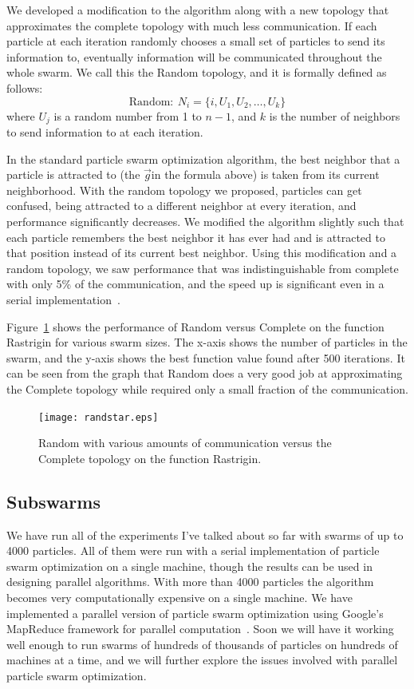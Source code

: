 \documentclass[onecolumn, 12pt]{article}
\providecommand{\gbest}{\ensuremath{\Vec{g}}}
\begin{document}
We developed a modification to the algorithm along with a new topology that
approximates the complete topology with much less communication.  If each
particle at each iteration randomly chooses a small set of particles to send
its information to, eventually information will be communicated throughout the
whole swarm.  We call this the Random topology, and it is formally defined as
follows:
\[\mathrm{Random:}\ N_i = \{i,U_1,U_2,\dots,U_k\}\]
where $U_j$ is a random number from 1 to $n-1$, and $k$ is the number of 
neighbors to send information to at each iteration.

In the standard particle swarm optimization algorithm, the best neighbor that a
particle is attracted to (the \gbest in the formula above) is taken from its
current neighborhood.  With the random topology we proposed, particles can get
confused, being attracted to a different neighbor at every iteration, and
performance significantly decreases.  We modified the algorithm slightly such
that each particle remembers the best neighbor it has ever had and is attracted
to that position instead of its current best neighbor.  Using this modification
and a random topology, we saw performance that was indistinguishable from
complete with only 5\% of the communication, and the speed up is significant
even in a serial implementation~\cite{mcnabb-cec09}.  

Figure~\ref{fig:rastrand} shows the performance of Random versus Complete on
the function Rastrigin for various swarm sizes.  The x-axis shows the number of
particles in the swarm, and the y-axis shows the best function value found
after 500 iterations.  It can be seen from the graph that Random does a very
good job at approximating the Complete topology while required only a small
fraction of the communication.

\begin{figure}
  \centering
  \texttt{[image: randstar.eps]}
  \caption{Random with various amounts of communication versus the Complete
  topology on the function Rastrigin.}
  \label{fig:rastrand}
\end{figure}

\subsection{Subswarms}

We have run all of the experiments I've talked about so far with swarms of up
to 4000 particles.  All of them were run with a serial implementation of
particle swarm optimization on a single machine, though the results can be used
in designing parallel algorithms.  With more than 4000 particles the algorithm
becomes very computationally expensive on a single machine.  We have
implemented a parallel version of particle swarm optimization using Google's
MapReduce framework for parallel computation~\cite{dean-osdi04}.  Soon we will
have it working well enough to run swarms of hundreds of thousands of particles
on hundreds of machines at a time, and we will further explore the issues
involved with parallel particle swarm optimization.  
\end{document}
